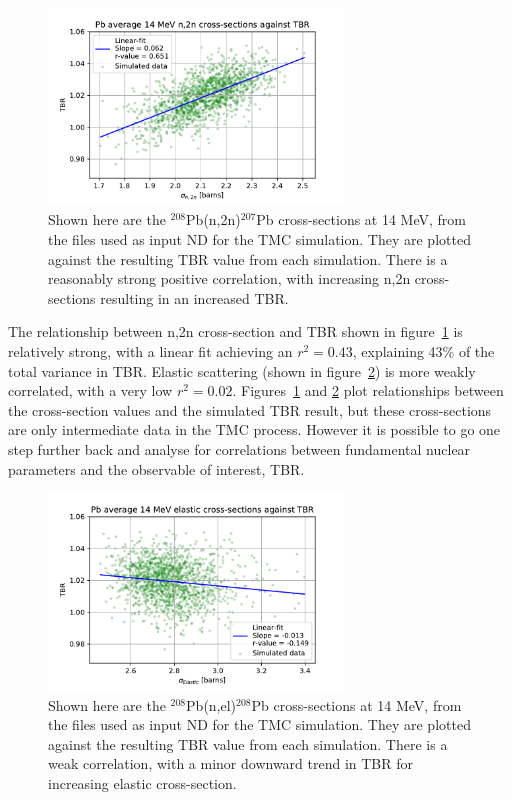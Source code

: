 \begin{figure}[H]
  \centering
	\includegraphics[width=0.7\textwidth]{TBR_n,2n}
	\caption{Shown here are the $^{208}$Pb(n,2n)$^{207}$Pb cross-sections at 14 MeV, from the files used as input ND for the TMC simulation. They are plotted against the resulting TBR value from each simulation. There is a reasonably strong positive correlation, with increasing n,2n cross-sections resulting in an increased TBR.}
	\label{fig:tbr_n2n}
\end{figure}

The relationship between n,2n cross-section and TBR shown in figure~\ref{fig:tbr_n2n} is relatively strong, with a linear fit achieving an $r^{2}=0.43$, explaining 43\% of the total variance in TBR. Elastic scattering (shown in figure~\ref{fig:tbr_elastic}) is more weakly correlated, with a very low $r^{2}=0.02$. Figures~\ref{fig:tbr_n2n} and \ref{fig:tbr_elastic} plot relationships between the cross-section values and the simulated TBR result, but these cross-sections are only intermediate data in the TMC process. However it is possible to go one step further back and analyse for correlations between fundamental nuclear parameters and the observable of interest, TBR. 

\begin{figure}[H]
  \centering
	\includegraphics[width=0.7\textwidth]{TBR_Elastic}
	\caption{Shown here are the $^{208}$Pb(n,el)$^{208}$Pb cross-sections at 14 MeV, from the files used as input ND for the TMC simulation. They are plotted against the resulting TBR value from each simulation. There is a weak correlation, with a minor downward trend in TBR for increasing elastic cross-section.}
	\label{fig:tbr_elastic}
\end{figure}

